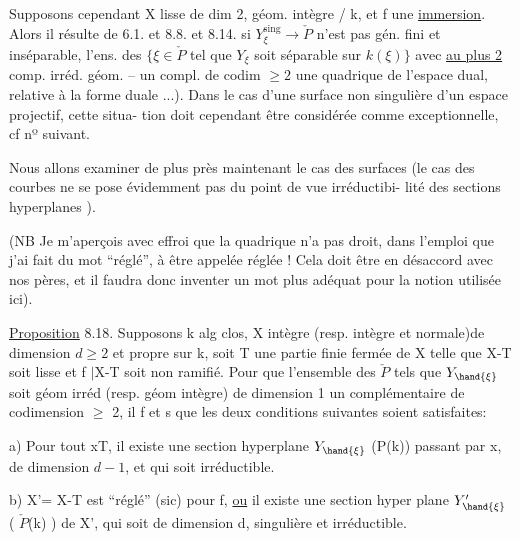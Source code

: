  Supposons cependant X lisse de dim 2, géom. intègre  / k, et f une \uline{immersion}. Alors il résulte de 6.1. et 8.8. et 8.14.  si $Y^{\mathrm{sing}}_{\xi} \to \check{P}$ n'est pas gén. fini et inséparable, l'ens. des $\{\xi \in \check{P}$ tel que $Y_{\xi}$ soit  séparable sur $k(\xi)\}$ avec \uline{au plus 2} comp. irréd. géom. -- un compl. de codim $\geq 2$
une quadrique de l'espace dual, relative à la forme duale ...).   Dans le
cas d'une surface non singulière  d'un espace projectif, cette situa-%
tion doit cependant être considérée comme exceptionnelle, cf nº suivant.

Nous allons examiner de plus près   maintenant le cas des surfaces
(le cas des courbes ne se pose évidemment pas du point de vue irréductibi-%
lité des sections hyperplanes  ).

(NB  Je m'aperçois avec effroi que la quadrique n'a pas droit, dans
l'emploi que j'ai fait du mot ``réglé'', à être appelée réglée !  Cela doit
être en désaccord avec nos pères, et il faudra donc inventer un mot plus
adéquat pour la notion utilisée ici).

\uline{Proposition} 8.18.  Supposons  k alg clos, X 
 intègre (resp. intègre et normale)de dimension $d \geq 2$ et
propre sur k, soit T une partie finie fermée de X telle que  X-T soit
lisse  et f $|$X-T  soit non ramifié.  Pour que l'ensemble des \hand{$\xi \in$} $\check{P}$  tels
que  $Y_{\hand{\xi}}$  soit  géom irréd   (resp.  géom intègre)  de dimension  1
  un complémentaire de  codimension $\geq$ 2, il f et s que les deux
conditions suivantes soient satisfaites:

a)  Pour tout x\hand{$\in$}T, il existe une section hyperplane $Y_{\hand{\xi}}$   (\hand{$\xi \in$}P(k))
passant par x, de dimension $d-1$, et qui soit irréductible.

b) X'= X-T est ``réglé'' (sic)  pour f, \uline{ou}  il existe  une section hyper
plane  $Y'_{\hand{\xi}}$  (\hand{$\xi \in$} $\check{P}$(k) )  de X',   qui soit de dimension d,
singulière et  irréductible.



